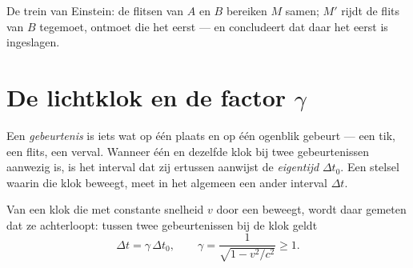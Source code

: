 \begin{omfigure}

{\small De trein van Einstein: de flitsen van $A$ en $B$ bereiken $M$ samen;
$M'$ rijdt de flits van $B$ tegemoet, ontmoet die het eerst --- en concludeert
dat daar het eerst is ingeslagen.}
\end{omfigure}

\section{De lichtklok en de factor $\gamma$}

\begin{definition}\label{def:g12:special-relativity:proper-time}
Een \emph{gebeurtenis} is iets wat op één plaats en op één
ogenblik gebeurt --- een tik, een flits, een verval. Wanneer één en dezelfde
klok bij twee gebeurtenissen aanwezig is, is het interval dat zij ertussen
aanwijst de \emph{eigentijd} $\Delta t_0$. Een stelsel waarin
die klok beweegt, meet in het algemeen een ander interval $\Delta t$.
\end{definition}

\begin{theorem}[Tijddilatatie]\label{thm:g12:special-relativity:dilation}
Van een klok die met constante snelheid $v$ door een 
beweegt, wordt daar gemeten dat ze achterloopt: tussen twee gebeurtenissen bij
de klok geldt
\[
\Delta t = \gamma\, \Delta t_0, \qquad
\gamma = \frac{1}{\sqrt{1 - v^2/c^2}} \geq 1 .
\]
\end{theorem}

